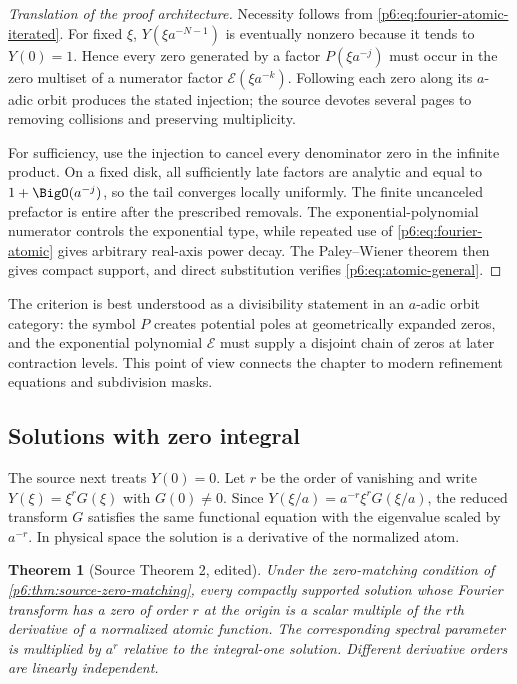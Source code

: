 \documentclass[11pt,oneside]{article}
\numberwithin{equation}{section}
\newtheorem{theorem}{Theorem}[section]
\theoremstyle{definition}
\theoremstyle{remark}
\begin{document}
\begin{proof}[Translation of the proof architecture]
Necessity follows from \eqref{p6:eq:fourier-atomic-iterated}.  For fixed $\xi$,
$Y(\xi a^{-N-1})$ is eventually nonzero because it tends to $Y(0)=1$.  Hence
every zero generated by a factor $P(\xi a^{-j})$ must occur in the zero multiset
of a numerator factor $\mathcal E(\xi a^{-k})$.  Following each zero along its
$a$-adic orbit produces the stated injection; the source devotes several pages
to removing collisions and preserving multiplicity.

For sufficiency, use the injection to cancel every denominator zero in the
infinite product.  On a fixed disk, all sufficiently late factors are analytic
and equal to $1+\BigO(a^{-j})$, so the tail converges locally uniformly.  The
finite uncanceled prefactor is entire after the prescribed removals.  The
exponential-polynomial numerator controls the exponential type, while repeated
use of \eqref{p6:eq:fourier-atomic} gives arbitrary real-axis power decay.  The
Paley--Wiener theorem then gives compact support, and direct substitution verifies
\eqref{p6:eq:atomic-general}.
\end{proof}

\begin{remark}
The criterion is best understood as a divisibility statement in an $a$-adic
orbit category: the symbol $P$ creates potential poles at geometrically expanded
zeros, and the exponential polynomial $\mathcal E$ must supply a disjoint chain
of zeros at later contraction levels.  This point of view connects the chapter
to modern refinement equations and subdivision masks.
\end{remark}

\subsection{Solutions with zero integral}

The source next treats $Y(0)=0$.  Let $r$ be the order of vanishing and write
$Y(\xi)=\xi^rG(\xi)$ with $G(0)\ne0$.  Since
$Y(\xi/a)=a^{-r}\xi^rG(\xi/a)$, the reduced transform $G$ satisfies the same
functional equation with the eigenvalue scaled by $a^{-r}$.  In physical space
the solution is a derivative of the normalized atom.

\begin{theorem}[Source Theorem 2, edited]\label{p6:thm:source-derivative-tower}
Under the zero-matching condition of \cref{p6:thm:source-zero-matching}, every
compactly supported solution whose Fourier transform has a zero of order $r$ at
the origin is a scalar multiple of the $r$th derivative of a normalized atomic
function.  The corresponding spectral parameter is multiplied by $a^r$ relative
to the integral-one solution.  Different derivative orders are linearly
independent.
\end{theorem}
\end{document}

